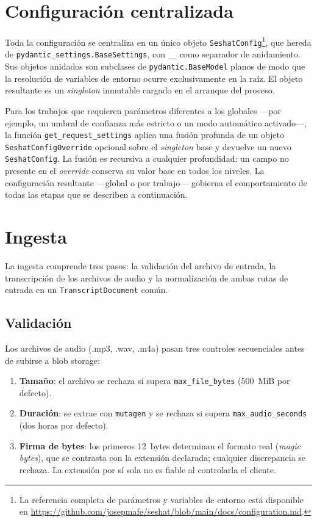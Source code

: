 \section{Configuración centralizada}

Toda la configuración se centraliza en un único objeto \texttt{SeshatConfig}\footnote{La
referencia completa de parámetros y variables de entorno está disponible en
\url{https://github.com/josepmafe/seshat/blob/main/docs/configuration.md}.},
que hereda de \texttt{pydantic\_settings.BaseSettings}, con \texttt{\_\_} como separador de
anidamiento. Sus objetos anidados son subclases de \texttt{pydantic.BaseModel} planos de
modo que la resolución de variables de entorno ocurre exclusivamente en la raíz. El objeto
resultante es un \textit{singleton} inmutable cargado en el arranque del proceso.

Para los trabajos que requieren parámetros diferentes a los globales —por ejemplo, un umbral
de confianza más estricto o un modo automático activado—, la función \texttt{get\_request\_settings}
aplica una fusión profunda de un objeto \texttt{SeshatConfigOverride} opcional sobre el
\textit{singleton} base y devuelve un nuevo \texttt{SeshatConfig}. La fusión es recursiva a
cualquier profundidad: un campo no presente en el \textit{override} conserva su valor base en
todos los niveles. La configuración resultante —global o por trabajo— gobierna el comportamiento
de todas las etapas que se describen a continuación.

\section{Ingesta}
La ingesta comprende tres pasos: la validación del archivo de entrada, la transcripción de los
archivos de audio y la normalización de ambas rutas de entrada en un \texttt{TranscriptDocument}
común.

\subsection{Validación}
\label{sec:validacion-ingesta}

Los archivos de audio (.mp3, .wav, .m4a) pasan tres controles secuenciales antes de subirse a
blob storage:

\begin{enumerate}
  \item \textbf{Tamaño}: el archivo se rechaza si supera \texttt{max\_file\_bytes} (500~MiB por
        defecto).
  \item \textbf{Duración}: se extrae con \texttt{mutagen} y se rechaza si supera
        \texttt{max\_audio\_seconds} (dos horas por defecto).
  \item \textbf{Firma de bytes}: los primeros 12~bytes determinan el formato real
        (\textit{magic bytes}), que se contrasta con la extensión declarada; cualquier
        discrepancia se rechaza. La extensión por sí sola no es fiable al controlarla el cliente.
\end{enumerate}

